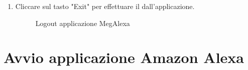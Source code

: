 \begin{enumerate}
	\item Cliccare sul tasto "Exit" per effettuare il dall'applicazione.
	\begin{figure}[H]
		\centering
		\caption{Logout applicazione MegAlexa}
	\end{figure}
\end{enumerate}
\section{Avvio applicazione Amazon Alexa}
\label{Avviso Amazon Alexa}
